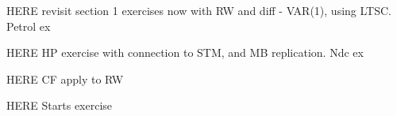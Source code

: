 \documentclass[a4paper]{book}
\def\pf{{\bf Proof. }}
\def\logimplies{\Rightarrow}
\def\convinlaw{\stackrel{{\cal L}}{\Longrightarrow }}
\def\convinp{\stackrel{P}{\longrightarrow }}
\def\convas{\stackrel{a.s.}{\longrightarrow }}
\def\convv{\stackrel{v}{\longrightarrow}}
\def\asymp{\stackrel{{\mathbb P}}{\sim}}
\def\RR{\mathbb R}
\def\ZZ{\mathbb Z}
\def\QQ{\mathbb Q}
\def\NN{\mathbb N}
\def\MM{\mathbb M}
\def\LL{\mathbb L}
\def\EE{\mathbb E}
\def\PP{\mathbb P}
\def\DD{\mathbb D}
\def\WW{\mathbb W}
\def\FF{\mathbb F}
\def\II{\mathbb I}
\def\FF{\mathbb F}
\begin{document}

HERE revisit section 1 exercises now with RW and diff - VAR(1), using LTSC.  Petrol ex

HERE  HP exercise with connection to STM, and MB replication.  Ndc ex

HERE CF apply to RW

HERE  Starts exercise



\def\pf{{\bf Proof. }}
\def\logimplies{\Rightarrow}
\def\convinlaw{\stackrel{{\cal L}}{\Longrightarrow }}
\def\convinp{\stackrel{P}{\longrightarrow }}
\def\convas{\stackrel{a.s.}{\longrightarrow }}
\def\convv{\stackrel{v}{\longrightarrow}}
\def\asymp{\stackrel{{\mathbb P}}{\sim}}
\def\RR{\mathbb R}
\def\ZZ{\mathbb Z}
\def\QQ{\mathbb Q}
\def\NN{\mathbb N}
\def\MM{\mathbb M}
\def\LL{\mathbb L}
\def\EE{\mathbb E}
\def\PP{\mathbb P}
\def\DD{\mathbb D}
\def\WW{\mathbb W}
\def\FF{\mathbb F}
\def\II{\mathbb I}
\def\FF{\mathbb F}
\def\ttheta{\widetilde{\theta}}
\def\tTheta{\widetilde{\Theta}}
\def\tsig{\widetilde{\sigma}^2}
\def\tc{\widetilde{c}}
\def\etheta{\widehat{\theta}}
\def\eTheta{\widehat{\Theta}}
\def\esig{\widehat{\sigma}^2}
\def\ptheta{\underline{\theta}}
\def\pTheta{\underline{\Theta}}
\def\psig{\underline{\sigma}^2}
\end{document}
